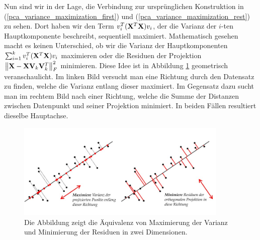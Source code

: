 Nun sind wir in der Lage, die Verbindung zur ursprünglichen Konstruktion in (\ref{pca_variance_maximization_first}) und (\ref{pca_variance_maximization_rest}) zu sehen. Dort haben wir den Term $v_i^T (\mathbf{X}^T \mathbf{X}) v_i$, der die Varianz der $i$-ten Hauptkomponente beschreibt, sequentiell maximiert. Mathematisch gesehen macht es keinen Unterschied, ob wir die Varianz der Hauptkomponenten $\sum_{i=1}^{k} v_i^T (\mathbf{X}^T \mathbf{X}) v_i$ maximieren oder die Residuen der Projektion $\left\lVert \mathbf{X} - \mathbf{X} \mathbf{V}_k \mathbf{V}_k^T \right\rVert_{F}^{2}$ minimieren. Diese Idee ist in Abbildung \ref{pca_projection_explanation} geometrisch veranschaulicht. Im linken Bild versucht man eine Richtung durch den Datensatz zu finden, welche die Varianz entlang dieser maximiert. Im Gegensatz dazu sucht man im rechtem Bild nach einer Richtung, welche die Summe der Distanzen zwischen Datenpunkt und seiner Projektion minimiert. In beiden Fällen resultiert dieselbe Hauptachse.

\begin{figure}
\centering
\includegraphics[width = 0.9\textwidth]{figures/pca_projection_explanation.jpg}
\caption{Die Abbildung zeigt die Äquivalenz von Maximierung der Varianz und Minimierung der Residuen in zwei Dimensionen.}
\label{pca_projection_explanation}
\end{figure} 


